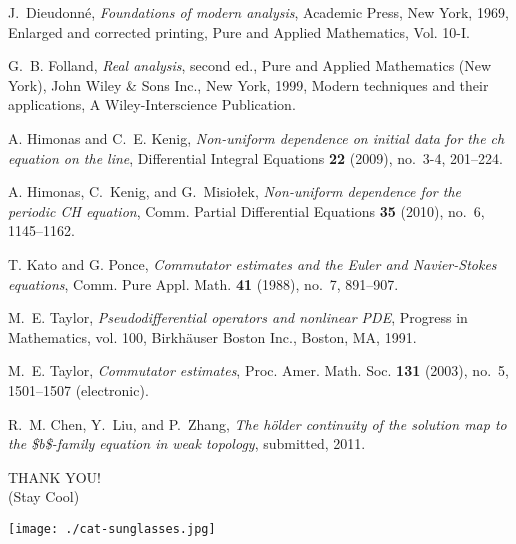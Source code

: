 \documentclass{beamer}
\begin{document}
\begin{thebibliography}{HKM09}

J.~Dieudonn{{\'e}}, \emph{Foundations of modern analysis}, Academic Press, New
  York, 1969, Enlarged and corrected printing, Pure and Applied Mathematics,
  Vol. 10-I. 

G.~B. Folland, \emph{Real analysis}, second ed., Pure and Applied
  Mathematics (New York), John Wiley \& Sons Inc., New York, 1999, Modern
  techniques and their applications, A Wiley-Interscience Publication.
  

A. Himonas and C.~E. Kenig, \emph{Non-uniform dependence on initial data
  for the ch equation on the line}, Differential Integral Equations \textbf{22}
  (2009), no.~3-4, 201--224.

A. Himonas, C.~Kenig, and G.~Misio{\l}ek, \emph{Non-uniform dependence for the
  periodic {CH} equation}, Comm. Partial Differential Equations \textbf{35}
  (2010), no.~6, 1145--1162. 

T. Kato and G. Ponce, \emph{Commutator estimates and the {E}uler and
  {N}avier-{S}tokes equations}, Comm. Pure Appl. Math. \textbf{41} (1988),
  no.~7, 891--907. 

M.~E. Taylor, \emph{Pseudodifferential operators and nonlinear {PDE}},
  Progress in Mathematics, vol. 100, Birkh{\"a}user Boston Inc., Boston, MA,
  1991. 

M.~E. Taylor, \emph{Commutator estimates}, Proc. Amer. Math. Soc.
  \textbf{131} (2003), no.~5, 1501--1507 (electronic). 
 
R.~M. Chen, Y.~Liu, and P.~Zhang, \emph{The h{\"o}lder continuity of the
  solution map to the {\$}b{\$}-family equation in weak topology}, submitted,
  2011.

\end{thebibliography}

\begin{frame}
  \begin{center}\Large THANK YOU!
  \\
  (Stay Cool)

    \texttt{[image: ./cat-sunglasses.jpg]}
\end{center}
\end{frame}
%
%

 
\end{document}
